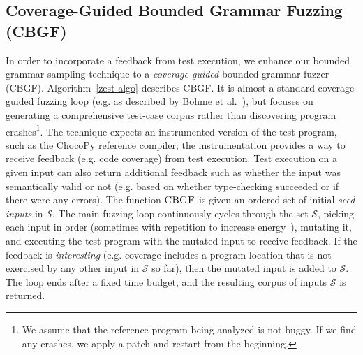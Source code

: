 \documentclass[conference]{IEEEtran}
\begin{document}
\subsection{Coverage-Guided Bounded Grammar Fuzzing (CBGF)}
\label{sec:cbgf}

In order to incorporate a feedback from test execution, we enhance our bounded grammar sampling technique to a \emph{coverage-guided} bounded grammar fuzzer (CBGF). Algorithm~\ref{zest-algo} describes CBGF. It is almost a standard coverage-guided fuzzing loop (e.g. as described by B{\"o}hme et al.~\cite{Bohme17}), but focuses on generating a comprehensive test-case corpus rather than discovering program crashes\footnote{We assume that the reference program being analyzed is not buggy. If we find any crashes, we apply a patch and restart from the beginning.}. The technique expects an instrumented version of the test program, such as the ChocoPy reference compiler; the instrumentation provides a way to receive feedback (e.g. code coverage) from test execution. Test execution on a given input can also return additional feedback such as whether the input was semantically valid or not (e.g. based on whether type-checking succeeded or if there were any errors). The function $\textproc{CBGF}$ is given an ordered set of initial \emph{seed inputs} in $\mathcal{S}$. The main fuzzing loop continuously cycles through the set $\mathcal{S}$, picking each input in order (sometimes with repetition to increase energy~\cite{Bohme17}), mutating it, and executing the test program with the mutated input to receive feedback. If the feedback is \emph{interesting} (e.g. coverage includes a program location that is not exercised by any other input in $\mathcal{S}$ so far), then the mutated input is added to $\mathcal{S}$. The loop ends after a fixed time budget, and the resulting corpus of inputs $\mathcal{S}$ is returned.
\end{document}
